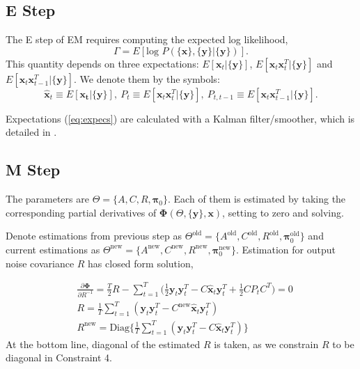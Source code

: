 \documentclass[fleqn]{article}
\let\oldref\ref
\renewcommand{\ref}[1]{(\oldref{#1})}
\newcommand{\T}{T}
\begin{document}
\subsection{E Step}
The E step of EM requires computing the expected log likelihood,
\[
    \Gamma = E[\text{log }P(\{\mathbf{x}\},\{\mathbf{y}\}|\{\mathbf{y}\})].
\]
This quantity depends on three expectations: $E[\mathbf{x}_t|\{\mathbf{y}\}]$, $E[\mathbf{x}_t\mathbf{x}_t^{\T}|\{\mathbf{y}\}]$ and $E[\mathbf{x}_t\mathbf{x}_{t-1}^{\T}|\{\mathbf{y}\}]$. We denote them by the symbols:
\begin{equation}\label{eq:expecs}
\hat{\mathbf{x}}_t \equiv E[\mathbf{x_t}|\{\mathbf{y}\}],\  P_t  \equiv E[\mathbf{x}_t\mathbf{x}_t^{\T}|\{\mathbf{y}\}],\  P_{t,t-1}  \equiv E[\mathbf{x}_t\mathbf{x}_{t-1}^{\T}|\{\mathbf{y}\}].
\end{equation}

Expectations \ref{eq:expecs} are calculated with a Kalman filter/smoother, which is detailed in .
\subsection{M Step}
The parameters are $\Theta =\{A,C,R,\mathbf{\pi}_0\}$. Each of them is estimated by taking the corresponding partial derivatives of $\mathbf{\Phi}(\Theta,\{\mathbf{y}\},\mathbf{x})$, setting to zero and solving.

Denote estimations from previous step as $\Theta^{\text{old}} =\{A^{\text{old}},C^{\text{old}},R^{\text{old}},\mathbf{\pi}_0^{\text{old}}\}$ and current estimations as $\Theta^{\text{new}} =\{A^{\text{new}},C^{\text{new}},R^{\text{new}},\mathbf{\pi}_0^{\text{new}}\}$. Estimation for output noise covariance $R$ has closed form solution,

\begin{equation}\label{eq:updateR}
\begin{aligned}
&\frac{\partial \mathbf{\Phi}}{\partial R^{-1}} = \frac{T}{2}R - \sum\limits_{t=1}^T\bigl(\frac{1}{2}\mathbf{y}_t\mathbf{y}_t^{\T} - C\hat{\mathbf{x}}_t\mathbf{y}_t^{\T}+\frac{1}{2}CP_tC^{\T}\bigr) =0 \\
& R = \frac{1}{T}\sum\limits_{t=1}^{T}(\mathbf{y}_t\mathbf{y}_t^{\T}-C^{\text{new}}\hat{\mathbf{x}}_t\mathbf{y}_t^{\T})\\
& R^{\text{new}} =\text{Diag}\biggl\{\frac{1}{T}\sum\limits_{t=1}^{T}(\mathbf{y}_t\mathbf{y}_t^{\T}-C\hat{\mathbf{x}}_t\mathbf{y}_t^{\T})\biggr\}
\end{aligned}
\end{equation}
At the bottom line, diagonal of the estimated $R$ is taken, as we constrain $R$ to be diagonal in Constraint 4.
\end{document}
